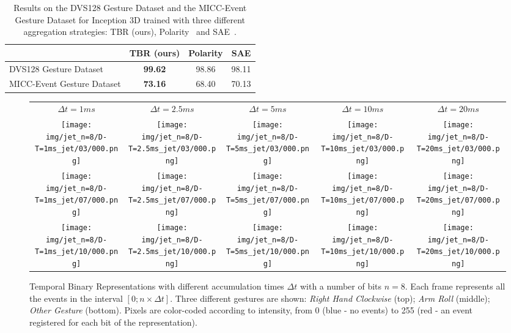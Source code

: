 \documentclass[a4paper,conference]{IEEEtran}
\begin{document}
\begin{table}[t]
	\caption{Results on the DVS128 Gesture Dataset and the MICC-Event Gesture Dataset for Inception 3D trained with three different aggregation strategies: TBR (ours), Polarity~\cite{nguyen2019real} and SAE~\cite{mueggler2017fast}.}
	\label{tab:micc-event}
	\begin{tabular}{l|c|c|c}
		& TBR (ours) & Polarity & SAE   \\ \hline
		DVS128 Gesture Dataset     & \textbf{99.62}		&	98.86		& 98.11 \\
		MICC-Event Gesture Dataset & \textbf{73.16}		& 	68.40		& 70.13 \\
	\end{tabular}
\end{table}

\begin{figure*}[t]
	\centering
	\begin{tabular}{ccccc}
		$\Delta t=1 ms$ & $\Delta t=2.5 ms$ & $\Delta t=5 ms$ & $\Delta t=10 ms$ & $\Delta t=20 ms$ \\
		\texttt{[image: img/jet\_n=8/D-T=1ms\_jet/03/000.png]} &
		\texttt{[image: img/jet\_n=8/D-T=2.5ms\_jet/03/000.png]} &
		\texttt{[image: img/jet\_n=8/D-T=5ms\_jet/03/000.png]} &
		\texttt{[image: img/jet\_n=8/D-T=10ms\_jet/03/000.png]} &
		\texttt{[image: img/jet\_n=8/D-T=20ms\_jet/03/000.png]} \\
		
		\texttt{[image: img/jet\_n=8/D-T=1ms\_jet/07/000.png]} &
		\texttt{[image: img/jet\_n=8/D-T=2.5ms\_jet/07/000.png]} &
		\texttt{[image: img/jet\_n=8/D-T=5ms\_jet/07/000.png]} &
		\texttt{[image: img/jet\_n=8/D-T=10ms\_jet/07/000.png]} &
		\texttt{[image: img/jet\_n=8/D-T=20ms\_jet/07/000.png]} \\
		
		\texttt{[image: img/jet\_n=8/D-T=1ms\_jet/10/000.png]} &
		\texttt{[image: img/jet\_n=8/D-T=2.5ms\_jet/10/000.png]} &
		\texttt{[image: img/jet\_n=8/D-T=5ms\_jet/10/000.png]} &
		\texttt{[image: img/jet\_n=8/D-T=10ms\_jet/10/000.png]} &
		\texttt{[image: img/jet\_n=8/D-T=20ms\_jet/10/000.png]} \\
	\end{tabular}
	\caption{Temporal Binary Representations with different accumulation times $\Delta t$ with a number of bits $n=8$. Each frame represents all the events in the interval $[ 0; n \times \Delta t ]$. Three different gestures are shown: \textit{Right Hand Clockwise} (top); \textit{Arm Roll} (middle); \textit{Other Gesture} (bottom). Pixels are color-coded according to intensity, from 0 (blue - no events) to 255 (red - an event registered for each bit of the representation).}
	\label{fig:deltat_fig}
\end{figure*}
\end{document}
